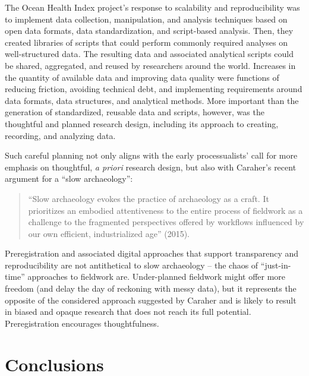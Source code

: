 \documentclass[article]{sa}
\begin{document}
The Ocean Health Index project's response to scalability and
reproducibility was to implement data collection, manipulation, and
analysis techniques based on open data formats, data standardization,
and script-based analysis. Then, they created libraries of scripts that
could perform commonly required analyses on well-structured data\emph{.}
The resulting data and associated analytical scripts could be shared,
aggregated, and reused by researchers around the world. Increases in the
quantity of available data and improving data quality were functions of
reducing friction, avoiding technical debt, and implementing
requirements around data formats, data structures, and analytical
methods. More important than the generation of standardized, reusable
data and scripts, however, was the thoughtful and planned research
design, including its approach to creating, recording, and analyzing
data.

Such careful planning not only aligns with the early processualists'
call for more emphasis on thoughtful, \emph{a priori} research design,
but also with Caraher's recent argument for a ``slow archaeology'':

\begin{quote}
    
``Slow archaeology evokes the practice of archaeology as a craft. It
prioritizes an embodied attentiveness to the entire process of fieldwork
as a challenge to the fragmented perspectives offered by workflows
influenced by our own efficient, industrialized age'' (2015).

\end{quote}

Preregistration and associated digital approaches that support
transparency and reproducibility are not antithetical to slow
archaeology -- the chaos of ``just-in-time'' approaches to fieldwork
are. Under-planned fieldwork might offer more freedom (and delay the day
of reckoning with messy data), but it represents the opposite of the
considered approach suggested by Caraher and is likely to result in
biased and opaque research that does not reach its full potential.
Preregistration encourages thoughtfulness.

\section{Conclusions}
\end{document}
